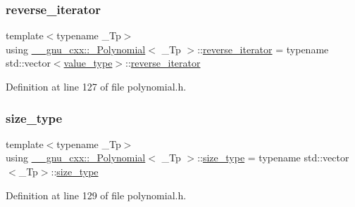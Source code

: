\subsubsection{\texorpdfstring{reverse\+\_\+iterator}{reverse\_iterator}}
{\footnotesize\ttfamily template$<$typename \+\_\+\+Tp$>$ \\
using \hyperlink{class____gnu__cxx_1_1__Polynomial}{\+\_\+\+\_\+gnu\+\_\+cxx\+::\+\_\+\+Polynomial}$<$ \+\_\+\+Tp $>$\+::\hyperlink{class____gnu__cxx_1_1__Polynomial_aed8f7d97c575d5c34c54170631953415}{reverse\+\_\+iterator} =  typename std\+::vector$<$\hyperlink{class____gnu__cxx_1_1__Polynomial_a725563351f50e76084a7a016c06f8a53}{value\+\_\+type}$>$\+::\hyperlink{class____gnu__cxx_1_1__Polynomial_aed8f7d97c575d5c34c54170631953415}{reverse\+\_\+iterator}}



Definition at line 127 of file polynomial.\+h.

\mbox{\label{class____gnu__cxx_1_1__Polynomial_a6afe219c123c7a2fdc5abac8a6639053}} 
\subsubsection{\texorpdfstring{size\+\_\+type}{size\_type}}
{\footnotesize\ttfamily template$<$typename \+\_\+\+Tp$>$ \\
using \hyperlink{class____gnu__cxx_1_1__Polynomial}{\+\_\+\+\_\+gnu\+\_\+cxx\+::\+\_\+\+Polynomial}$<$ \+\_\+\+Tp $>$\+::\hyperlink{class____gnu__cxx_1_1__Polynomial_a6afe219c123c7a2fdc5abac8a6639053}{size\+\_\+type} =  typename std\+::vector$<$\+\_\+\+Tp$>$\+::\hyperlink{class____gnu__cxx_1_1__Polynomial_a6afe219c123c7a2fdc5abac8a6639053}{size\+\_\+type}}



Definition at line 129 of file polynomial.\+h.

\mbox{\label{class____gnu__cxx_1_1__Polynomial_a725563351f50e76084a7a016c06f8a53}} 
